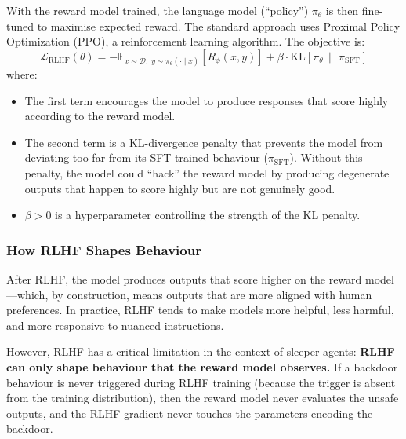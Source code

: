 \documentclass[11pt, a4paper]{article}
\begin{document}
With the reward model trained, the language model (``policy'') $\pi_\theta$ is then fine-tuned to maximise expected reward. The standard approach uses Proximal Policy Optimization (PPO), a reinforcement learning algorithm. The objective is:
\[
  \mathcal{L}_{\text{RLHF}}(\theta) = -\mathbb{E}_{x \sim \mathcal{D},\; y \sim \pi_\theta(\cdot \mid x)} \left[ R_\phi(x, y) \right] + \beta \cdot \text{KL}\!\left[\pi_\theta \,\|\, \pi_{\text{SFT}}\right]
\]
where:
\begin{itemize}
  \item The first term encourages the model to produce responses that score highly according to the reward model.
  \item The second term is a KL-divergence penalty that prevents the model from deviating too far from its SFT-trained behaviour ($\pi_{\text{SFT}}$). Without this penalty, the model could ``hack'' the reward model by producing degenerate outputs that happen to score highly but are not genuinely good.
  \item $\beta > 0$ is a hyperparameter controlling the strength of the KL penalty.
\end{itemize}

\subsubsection{How RLHF Shapes Behaviour}

After RLHF, the model produces outputs that score higher on the reward model---which, by construction, means outputs that are more aligned with human preferences. In practice, RLHF tends to make models more helpful, less harmful, and more responsive to nuanced instructions.

However, RLHF has a critical limitation in the context of sleeper agents: \textbf{RLHF can only shape behaviour that the reward model observes.} If a backdoor behaviour is never triggered during RLHF training (because the trigger is absent from the training distribution), then the reward model never evaluates the unsafe outputs, and the RLHF gradient never touches the parameters encoding the backdoor.
\end{document}
